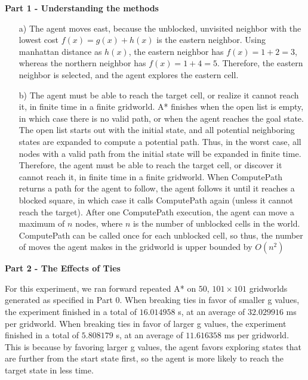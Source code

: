 \documentclass[11pt]{article}
\begin{document}
    \begin{center}
        \Large
        \textbf{Part 1 - Understanding the methods}
    \end{center}
    \normalsize
    \begin{enumerate}
        \item[a)] The agent moves east, because the unblocked,
        unvisited neighbor with the lowest cost $f(x) = g(x) + h(x)$ is the eastern neighbor.
        Using manhattan distance as $h(x)$, the eastern neighbor has $f(x) = 1 + 2 = 3$,
        whereas the northern neighbor has $f(x) = 1 + 4 = 5$.
        Therefore, the eastern neighbor is selected, and the agent explores the eastern cell.
        \item[b)] The agent must be able to reach the target cell, or realize it cannot reach it, in finite time in a finite gridworld.
        A* finishes when the open list is empty, in which case there is no valid path, or when the agent reaches the goal state.
        The open list starts out with the initial state, and all potential neighboring states are expanded to compute a potential path.
        Thus, in the worst case, all nodes with a valid path from the initial state will be expanded in finite time.
        Therefore, the agent must be able to reach the target cell, or discover it cannot reach it, in finite time in a finite gridworld.
        When ComputePath returns a path for the agent to follow, the agent follows it until it reaches a blocked square,
        in which case it calls ComputePath again (unless it cannot reach the target).
        After one ComputePath execution, the agent can move a maximum of $n$ nodes, where $n$ is the number
        of unblocked cells in the world.
        ComputePath can be called once for each unblocked cell, so thus, the number of moves the agent makes in the gridworld
        is upper bounded by $O(n^2)$
    \end{enumerate}

    \begin{center}
        \Large
        \textbf{Part 2 - The Effects of Ties}
    \end{center}
    \normalsize
    For this experiment, we ran forward repeated A* on $50$, $101 \times 101$ gridworlds generated as specified in Part 0.
    When breaking ties in favor of smaller g values, the experiment finished in a total of $16.014958$ s, at an average of $32.029916$ ms per gridworld.
    When breaking ties in favor of larger g values, the experiment finished in a total of $5.808179$ s, at an average of $11.616358$ ms per gridworld.
    \newline\newline
    This is because by favoring larger g values, the agent favors exploring states that are further from the start state first, so the agent
    is more likely to reach the target state in less time.
    
\end{document}
